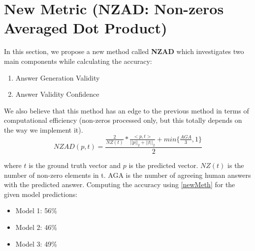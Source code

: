 \documentclass{article}
\begin{document}
\section{New Metric (NZAD: Non-zeros Averaged Dot Product)}
In this section, we propose a new method called \textbf{NZAD} which investigates two main components while calculating the accuracy:
\begin{enumerate}
    \item Answer Generation Validity
    \item Answer Validity Confidence
\end{enumerate}
We also believe that this method has an edge to the previous method in terms of computational efficiency (non-zeros processed only, but this totally depends on the way we implement it).
\begin{equation}
    \label{newMeth}
    NZAD(p, t) = \frac{\frac{2}{NZ(t)} * \frac{<p, t>}{||p||_2 + ||t||_2} + min\{ \frac{AGA}{3}, 1\}}{2}
\end{equation}

where $t$ is the ground truth vector and $p$ is the predicted vector. $NZ(t)$ is the number of non-zero elements in t. AGA is the number of agreeing human answers with the predicted answer. Computing the accuracy using \ref{newMeth} for the given model predictions:
\begin{itemize}
    \item Model 1: 56\%
    \item Model 2: 46\%
    \item Model 3: 49\%
\end{itemize}
\end{document}
